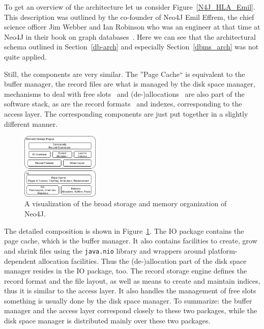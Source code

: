         To get an overview of the architecture let us consider Figure~\ref{N4J_HLA_Emil}.
        This description was outlined by the co-founder of Neo4J Emil Effrem, the chief science officer Jim Webber and Ian Robinson who was an engineer at that time at Neo4J in their book on graph databases~\autocite{robinson2015graph}.
        Here we can see that the architectural schema outlined in Section~\ref{db-arch} and especially Section~\ref{dbms_arch} was not quite applied.
        
        Still, the components are very similar.
        The ''Page Cache`` is equivalent to the buffer manager, the record files are what is managed by the disk space manager, mechanisms to deal with free slots~\autocite{neo4jidgenerator} and (de-)allocations~\autocite{neo4jio} are also part of the software stack, as are the record formats~\autocite{neo4jrecordstorage} and indexes, corresponding to the access layer. 
        The corresponding components are just put together in a slightly different manner. 
        
        \begin{figure}[htp]
            \begin{center}
                \includegraphics[keepaspectratio,width=0.33\textwidth,height=0.3\textheight]{img/04-databases/N4J_Storage.png}
            \end{center}
            \caption{A visualization of the broad storage and memory organization of Neo4J.} \label{N4J_Storage}
        \end{figure}
        
        The detailed composition is shown in Figure~\ref{N4J_Storage}.
        The IO package contains the page cache, which is the buffer manager.
        It also contains facilities to create, grow and shrink files using the \texttt{java.nio} library and wrappers around platform-dependent allocation facilities.
        Thus the (de-)allocation part of the disk space manager resides in the IO package, too.
        The record storage engine defines the record format and the file layout, as well as means to create and maintain indices, thus it is similar to the access layer. 
        It also handles the management of free slots something is usually done by the disk space manager.
        To summarize: the buffer manager and the access layer correspond closely to these two packages, while the disk space manager is distributed mainly over these two packages.        


